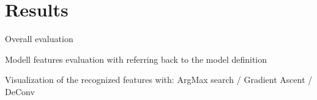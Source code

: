 \section{Results}

Overall evaluation

Modell features evaluation with referring back to the model definition

Visualization of the recognized features with:
ArgMax search / Gradient Ascent / DeConv
